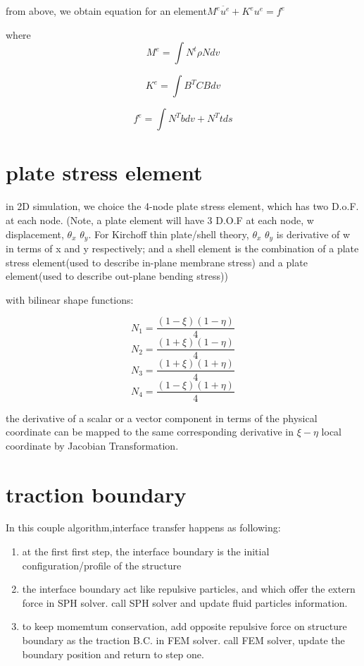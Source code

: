 \documentclass[11pt]{article}
\begin{document}
from above, we obtain equation for an element$ M^e \ddot{u^e} + K^e {u^e} = f^e $

where $$ M^e = \int N^t \rho N dv $$

	$$ K^e = \int B^T C B dv $$

	$$ f^e = \int N^T b dv + N^T t ds $$

\section {plate stress element}
in 2D simulation, we choice the 4-node plate stress element, which has two D.o.F. at each node. (Note, a plate element will have 3 D.O.F at each node, w displacement, $\theta_x$ $\theta_y$. For Kirchoff thin plate/shell theory, $\theta_x$ $\theta_y$ is derivative of w in terms of x and y respectively; and a shell element is the combination of a plate stress element(used to describe in-plane membrane stress) and a plate element(used to describe out-plane bending stress)) 

with bilinear shape functions:

$$N_1 = \frac{(1-\xi)(1-\eta)}{4}$$
$$N_2 = \frac{(1+\xi)(1-\eta)}{4}$$
$$N_3 = \frac{(1+\xi)(1+\eta)}{4}$$
$$N_4 = \frac{(1-\xi)(1+\eta)}{4}$$

the derivative of a scalar or a vector component in terms of the physical coordinate can be mapped to the same corresponding derivative in $\xi-\eta$ local coordinate by Jacobian Transformation. 



\section {traction boundary}

In this couple algorithm,interface transfer happens as following:

\begin{enumerate}
\item 
  at the first first step, the interface boundary is the initial configuration/profile of the structure
\item
  the interface boundary act like repulsive particles, and which offer the extern force in SPH solver. call SPH solver and  update fluid particles information.
\item
  to keep momemtum conservation, add opposite repulsive force on structure boundary as the traction B.C. in FEM solver. call FEM solver, update the boundary position and return to step one. 
\end{enumerate}
\end{document}
